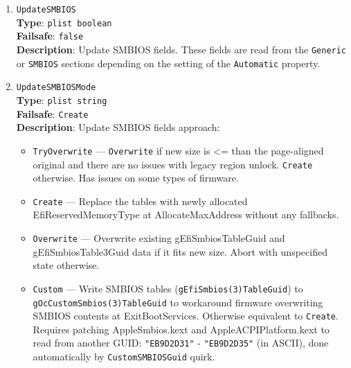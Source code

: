 \documentclass[]{article}
\providecommand{\tightlist}{%
  \setlength{\itemsep}{0pt}\setlength{\parskip}{0pt}}
\begin{document}
\begin{enumerate}
  These fields are read from the \texttt{Generic} or \texttt{PlatformNVRAM}
  sections depending on the setting of the \texttt{Automatic} property.
  All the other fields are to be specified with the \texttt{NVRAM} section.

  If \texttt{UpdateNVRAM} is set to \texttt{false}, the aforementioned
  variables can be updated with the \hyperref[nvram]{\texttt{NVRAM}}
  section. If \texttt{UpdateNVRAM} is set to \texttt{true}, the behaviour is
  undefined when any of the fields are present in the \texttt{NVRAM} section.
\item
  \texttt{UpdateSMBIOS}\\
  \textbf{Type}: \texttt{plist\ boolean}\\
  \textbf{Failsafe}: \texttt{false}\\
  \textbf{Description}: Update SMBIOS fields. These fields are read from the
  \texttt{Generic} or \texttt{SMBIOS} sections depending on
  the setting of the \texttt{Automatic} property.
\item
  \texttt{UpdateSMBIOSMode}\\
  \textbf{Type}: \texttt{plist\ string}\\
  \textbf{Failsafe}: \texttt{Create}\\
  \textbf{Description}: Update SMBIOS fields approach:

  \begin{itemize}
  \tightlist
  \item
    \texttt{TryOverwrite} --- \texttt{Overwrite} if new size is \textless{}= than
    the page-aligned original and there are no issues with legacy region
    unlock. \texttt{Create} otherwise. Has issues on some types of firmware.
  \item
    \texttt{Create} --- Replace the tables with newly allocated
    EfiReservedMemoryType at AllocateMaxAddress without any fallbacks.
  \item
    \texttt{Overwrite} --- Overwrite existing gEfiSmbiosTableGuid and
    gEfiSmbiosTable3Guid data if it fits new size. Abort with
    unspecified state otherwise.
  \item
    \texttt{Custom} --- Write SMBIOS tables
    (\texttt{gEfiSmbios(3)TableGuid}) to \texttt{gOcCustomSmbios(3)TableGuid}
    to workaround firmware overwriting SMBIOS contents at
    ExitBootServices. Otherwise equivalent to \texttt{Create}. Requires
    patching AppleSmbios.kext and AppleACPIPlatform.kext to read from
    another GUID: \texttt{"EB9D2D31"} - \texttt{"EB9D2D35"} (in ASCII),
    done automatically by \texttt{CustomSMBIOSGuid} quirk.
  \end{itemize}


\end{enumerate}
\end{document}
